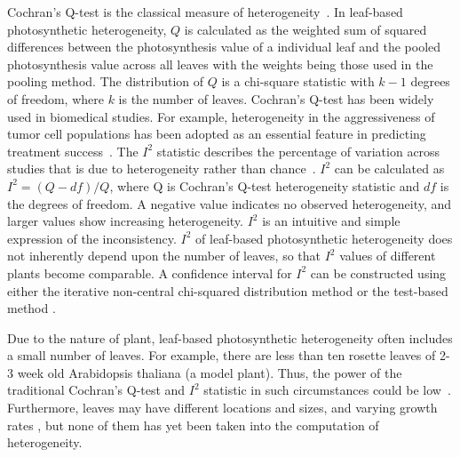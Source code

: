 \documentclass{bioinfo}
\begin{document}
Cochran's Q-test is the classical measure of heterogeneity~\citep{conover1999Practical}. In leaf-based photosynthetic heterogeneity, $Q$ is calculated as the weighted sum of squared differences between the photosynthesis value of a individual leaf and the pooled photosynthesis value across all leaves with the weights being those used in the pooling method. The distribution of $Q$ is a chi-square statistic with $k-1$ degrees of freedom, where $k$ is the number of leaves. Cochran's Q-test has been widely used in biomedical studies. For example, heterogeneity in the aggressiveness of tumor cell populations has been adopted as an essential feature in predicting treatment success~\citep{OSullivan2003}. %
%
%
%
The $I^2$ statistic describes the percentage of variation across studies that is due to heterogeneity rather than chance~\citep{higgins2002quantifying,higgins2003measuring}. $I^2$ can be calculated as $I^2 = (Q - df)/Q$, where Q is Cochran's Q-test heterogeneity statistic and $df$ is the degrees of freedom. A negative value  indicates no observed heterogeneity, and larger values show increasing heterogeneity. $I^2$ is an intuitive and simple expression of the inconsistency. $I^2$ of leaf-based photosynthetic heterogeneity does not inherently depend upon the number of leaves, so that $I^2$ values of different plants become comparable. A confidence interval for $I^2$ can be constructed using either the iterative non-central chi-squared distribution method \citep{hedges2001power} or the test-based method \citep{higgins2002quantifying}.

Due to the nature of plant, leaf-based photosynthetic heterogeneity often includes a small number of leaves. For example, there are less than ten rosette leaves of 2-3 week old Arabidopsis thaliana (a model plant). Thus, the power of the traditional Cochran's Q-test and $I^2$ statistic in such circumstances could be low~\citep{higgins2003measuring, gavaghan2000evaluation,huedo2006assessing,ioannidis2007uncertainty}. Furthermore, leaves may have different locations and sizes, and varying growth rates \citep{van1991insertional}, but none of them has yet been taken into the computation of heterogeneity.
\end{document}
